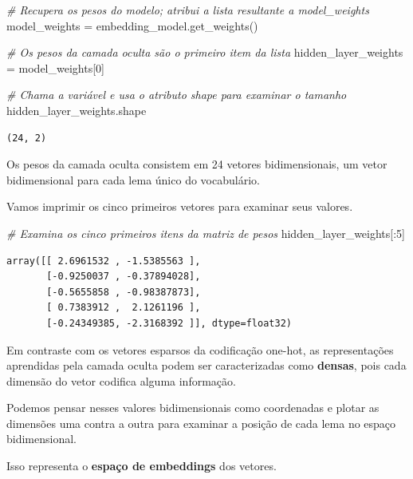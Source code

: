 \documentclass[
  brazilian,
]{article}
\newenvironment{Shaded}{}{}
\newcommand{\CommentTok}[1]{\textcolor[rgb]{0.38,0.63,0.69}{\textit{#1}}}
\newcommand{\DecValTok}[1]{\textcolor[rgb]{0.25,0.63,0.44}{#1}}
\newcommand{\NormalTok}[1]{#1}
\newcommand{\OperatorTok}[1]{\textcolor[rgb]{0.40,0.40,0.40}{#1}}
\begin{document}
\begin{Shaded}
\begin{Highlighting}[]
\CommentTok{\# Recupera os pesos do modelo; atribui a lista resultante a \textquotesingle{}model\_weights\textquotesingle{}}
\NormalTok{model\_weights }\OperatorTok{=}\NormalTok{ embedding\_model.get\_weights()}

\CommentTok{\# Os pesos da camada oculta são o primeiro item da lista}
\NormalTok{hidden\_layer\_weights }\OperatorTok{=}\NormalTok{ model\_weights[}\DecValTok{0}\NormalTok{]}

\CommentTok{\# Chama a variável e usa o atributo \textquotesingle{}shape\textquotesingle{} para examinar o tamanho}
\NormalTok{hidden\_layer\_weights.shape}
\end{Highlighting}
\end{Shaded}

\begin{verbatim}
(24, 2)
\end{verbatim}

Os pesos da camada oculta consistem em 24 vetores bidimensionais, um
vetor bidimensional para cada lema único do vocabulário.

Vamos imprimir os cinco primeiros vetores para examinar seus valores.

\begin{Shaded}
\begin{Highlighting}[]
\CommentTok{\# Examina os cinco primeiros itens da matriz de pesos}
\NormalTok{hidden\_layer\_weights[:}\DecValTok{5}\NormalTok{]}
\end{Highlighting}
\end{Shaded}

\begin{verbatim}
array([[ 2.6961532 , -1.5385563 ],
       [-0.9250037 , -0.37894028],
       [-0.5655858 , -0.98387873],
       [ 0.7383912 ,  2.1261196 ],
       [-0.24349385, -2.3168392 ]], dtype=float32)
\end{verbatim}

Em contraste com os vetores esparsos da codificação one-hot, as
representações aprendidas pela camada oculta podem ser caracterizadas
como \textbf{densas}, pois cada dimensão do vetor codifica alguma
informação.

Podemos pensar nesses valores bidimensionais como coordenadas e plotar
as dimensões uma contra a outra para examinar a posição de cada lema no
espaço bidimensional.

Isso representa o \textbf{espaço de embeddings} dos vetores.
\end{document}
